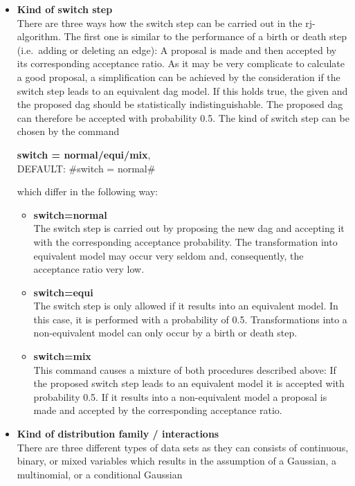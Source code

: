\begin{itemize}
\item {\bf Kind of switch step} \label{switch_step} \\
There are three ways how the switch step can be carried out in the
rj-algorithm. The first one is similar to the performance of a
birth or death step (i.e.~adding or deleting an edge): A proposal
is made and then accepted by its corresponding acceptance ratio.
As it may be very complicate to calculate a good proposal, a
simplification can be achieved by the consideration if the switch
step leads to an equivalent dag model. If this holds true, the
given and the proposed dag should be statistically
indistinguishable. The proposed dag can therefore be accepted with
probability 0.5. The kind of switch step can be chosen by the
command
\begin{center}
    {\bf switch = normal/equi/mix}, \\
    \hspace*{-1.8cm}  DEFAULT: #switch = normal#
\end{center}
which differ in the following way:
\begin{itemize}
\item {\bf switch=normal}\\
The switch step is carried out by proposing the new dag and
accepting it with the corresponding acceptance probability. The
transformation into equivalent model may occur very seldom and,
consequently, the acceptance ratio very low.
\item {\bf switch=equi} \\
The switch step is only allowed if it results into an equivalent
model. In this case, it is performed with a probability of 0.5.
Transformations into a non-equivalent model can only occur by a
birth or death step.
\item {\bf switch=mix}\\
This command causes a mixture of both procedures described above:
If the proposed switch step leads to an equivalent model it is
accepted with probability 0.5. If it results into a non-equivalent
model a proposal is made and accepted by the corresponding
acceptance ratio.
\end{itemize}
\item {\bf Kind of distribution family / interactions }\\
There are three different types of data sets as they can consists
of continuous, binary, or mixed variables which results in the
assumption of a Gaussian, a multinomial, or a conditional Gaussian

\end{itemize}
